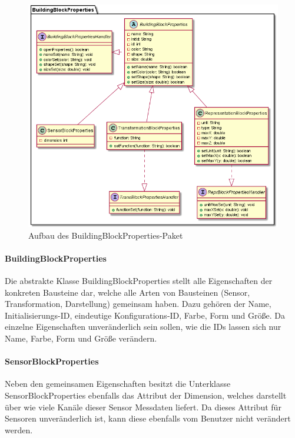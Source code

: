 \documentclass[parskip=full]{scrartcl}
\begin{document}
\begin{figure}[htbp]
	\begin{center}
		\includegraphics[width = 14cm]{Grafiken/BuildingBlockPropertiesNamespace.png}
		\caption{Aufbau des BuildingBlockProperties-Paket}
		\label{Entwurf_Grob}
	\end{center}
\end{figure}

\paragraph{BuildingBlockProperties}

Die abstrakte Klasse BuildingBlockProperties stellt alle Eigenschaften der konkreten Bausteine dar, welche alle Arten von Bausteinen (Sensor, Transformation, Darstellung) gemeinsam haben. Dazu gehören der Name,  Initialisierungs-ID, eindeutige Konfigurations-ID, Farbe, Form und Größe. Da einzelne Eigenschaften unveränderlich sein sollen, wie die IDs lassen sich nur Name, Farbe, Form und Größe verändern.

\paragraph{SensorBlockProperties}

Neben den gemeinsamen Eigenschaften besitzt die Unterklasse SensorBlockProperties ebenfalls das Attribut der Dimension, welches darstellt über wie viele Kanäle dieser Sensor Messdaten liefert. Da dieses Attribut für Sensoren unveränderlich ist, kann diese ebenfalls vom Benutzer nicht verändert werden.
\end{document}
